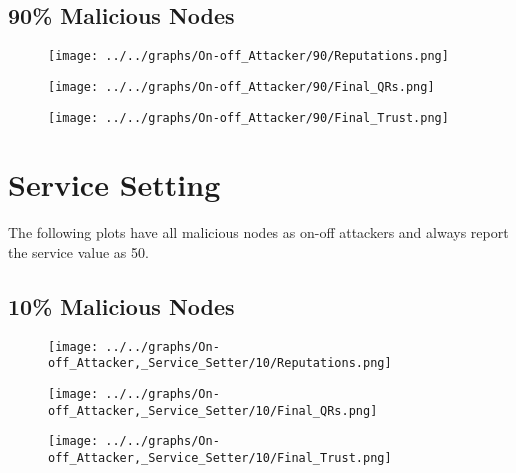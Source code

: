 \begin{minipage}[t]{0.49\columnwidth}
\subsection*{90\% Malicious Nodes}
    \begin{figure}[H]
        \centering
        \texttt{[image: ../../graphs/On-off\_Attacker/90/Reputations.png]}
    \end{figure}
    \begin{figure}[H]
        \centering
        \texttt{[image: ../../graphs/On-off\_Attacker/90/Final\_QRs.png]}
    \end{figure}
\end{minipage}
\begin{minipage}[t]{0.49\columnwidth}
    \begin{figure}[H]
        \centering
        \texttt{[image: ../../graphs/On-off\_Attacker/90/Final\_Trust.png]}
    \end{figure}
\end{minipage}
\newpage

\section*{Service Setting}
The following plots have all malicious nodes as on-off attackers and always
report the service value as 50.
\\
\begin{minipage}[t]{0.49\columnwidth}
\subsection*{10\% Malicious Nodes}
    \begin{figure}[H]
        \centering
        \texttt{[image: ../../graphs/On-off\_Attacker,\_Service\_Setter/10/Reputations.png]}
    \end{figure}
    \begin{figure}[H]
        \centering
        \texttt{[image: ../../graphs/On-off\_Attacker,\_Service\_Setter/10/Final\_QRs.png]}
    \end{figure}
\end{minipage}
\begin{minipage}[t]{0.49\columnwidth}
    \begin{figure}[H]
        \centering
        \texttt{[image: ../../graphs/On-off\_Attacker,\_Service\_Setter/10/Final\_Trust.png]}
    \end{figure}
\end{minipage}


